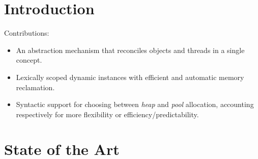 \documentclass{llncs}
\begin{document}
\section{Introduction}

\begin{comment}
this distinction between data and control data shows that both memory and 
control need to be allocated dynamically.

allocate code dynamically

protothreads / ocram cannot dynamically allocate threads

they should use statically allocated with loops

probls: no composition (as they are global)
        no reuse of memory (because they are alway active)

Dynamic functionality in embedded systems is usually discouraged due to 
resource constraints.
However, some types of applications inherently require memory allocation.

As an example, protocols in sensor networks typically forward messages through nodes at a non-deterministic rate, given that the number of neighbors and transmission periods can vary.
Hence, many protocols require dynamic memory management to hold receiving messages until they are successfully forwarded.

A simple FIFO queue might not be always optimal because forwarding a message may involve multiple steps with delays (e.g. transmission acknowledgments).
In such scenario, the protocol would rather handle multiple messages at the same time, raising the possibility of a message received later be discarded first.
\end{comment}

Contributions:

\begin{itemize}
\item An abstraction mechanism that reconciles objects and threads in a single 
        concept.

\item Lexically scoped dynamic instances with efficient and automatic memory 
        reclamation.

\item Syntactic support for choosing between \emph{heap} and \emph{pool} 
        allocation, accounting respectively for more flexibility or 
efficiency/predictability.
\end{itemize}

\section{State of the Art}
\end{document}
